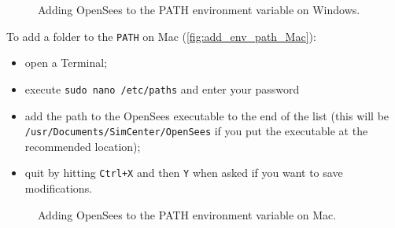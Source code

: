 \begin{figure}[!htbp]
  \caption{Adding OpenSees to the PATH environment variable on Windows.}
  \label{fig:add_env_path}
\end{figure}

To add a folder to the \texttt{PATH} on Mac (\autoref{fig:add_env_path_Mac}):

\begin{itemize}
    \item open a Terminal;
    \item execute \texttt{sudo nano /etc/paths} and enter your password
    \item add the path to the OpenSees executable to the end of the list (this will be \texttt{/usr/Documents/SimCenter/OpenSees} if you put the executable at the recommended location);
    \item quit by hitting \texttt{Ctrl+X} and then \texttt{Y} when asked if you want to save modifications.
\end{itemize}

\begin{figure}[!htbp]
  \caption{Adding OpenSees to the PATH environment variable on Mac.}
  \label{fig:add_env_path_Mac}
\end{figure}

